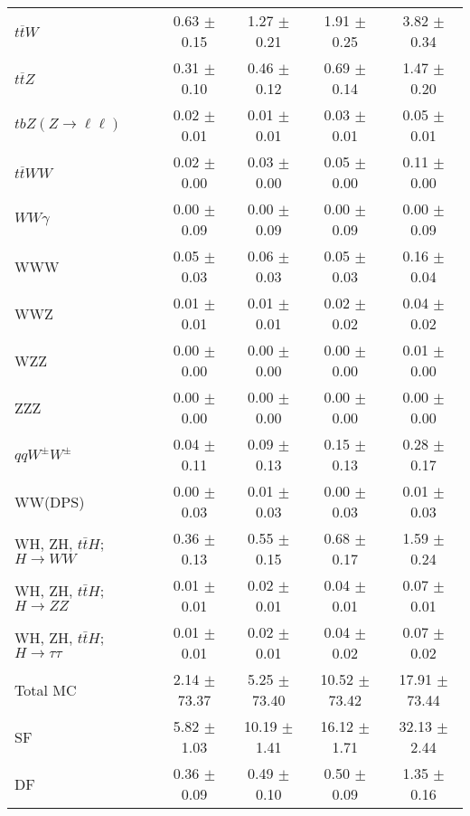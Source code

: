 \begin{tabular}{l|cccc}
                   $t\overline{t}W$ &  0.63 $\pm$  0.15 &  1.27 $\pm$  0.21 &  1.91 $\pm$  0.25 &  3.82 $\pm$  0.34 \\
                   $t\overline{t}Z$ &  0.31 $\pm$  0.10 &  0.46 $\pm$  0.12 &  0.69 $\pm$  0.14 &  1.47 $\pm$  0.20 \\
    $tbZ (Z \rightarrow \ell \ell)$ &  0.02 $\pm$  0.01 &  0.01 $\pm$  0.01 &  0.03 $\pm$  0.01 &  0.05 $\pm$  0.01 \\
                  $t\overline{t}WW$ &  0.02 $\pm$  0.00 &  0.03 $\pm$  0.00 &  0.05 $\pm$  0.00 &  0.11 $\pm$  0.00 \\
                         $WW\gamma$ &  0.00 $\pm$  0.09 &  0.00 $\pm$  0.09 &  0.00 $\pm$  0.09 &  0.00 $\pm$  0.09 \\
                                WWW &  0.05 $\pm$  0.03 &  0.06 $\pm$  0.03 &  0.05 $\pm$  0.03 &  0.16 $\pm$  0.04 \\
                                WWZ &  0.01 $\pm$  0.01 &  0.01 $\pm$  0.01 &  0.02 $\pm$  0.02 &  0.04 $\pm$  0.02 \\
                                WZZ &  0.00 $\pm$  0.00 &  0.00 $\pm$  0.00 &  0.00 $\pm$  0.00 &  0.01 $\pm$  0.00 \\
                                ZZZ &  0.00 $\pm$  0.00 &  0.00 $\pm$  0.00 &  0.00 $\pm$  0.00 &  0.00 $\pm$  0.00 \\
                 $qqW^{\pm}W^{\pm}$ &  0.04 $\pm$  0.11 &  0.09 $\pm$  0.13 &  0.15 $\pm$  0.13 &  0.28 $\pm$  0.17 \\
                            WW(DPS) &  0.00 $\pm$  0.03 &  0.01 $\pm$  0.03 &  0.00 $\pm$  0.03 &  0.01 $\pm$  0.03 \\
WH, ZH, $t\bar{t}H$; $H \rightarrow WW$ &  0.36 $\pm$  0.13 &  0.55 $\pm$  0.15 &  0.68 $\pm$  0.17 &  1.59 $\pm$  0.24 \\
WH, ZH, $t\bar{t}H$; $H \rightarrow ZZ$ &  0.01 $\pm$  0.01 &  0.02 $\pm$  0.01 &  0.04 $\pm$  0.01 &  0.07 $\pm$  0.01 \\
WH, ZH, $t\bar{t}H$; $H \rightarrow \tau\tau$ &  0.01 $\pm$  0.01 &  0.02 $\pm$  0.01 &  0.04 $\pm$  0.02 &  0.07 $\pm$  0.02 \\
\hline\hline
                           Total MC &  2.14 $\pm$ 73.37 &  5.25 $\pm$ 73.40 & 10.52 $\pm$ 73.42 & 17.91 $\pm$ 73.44 \\
\hline
                                 SF &  5.82 $\pm$  1.03 & 10.19 $\pm$  1.41 & 16.12 $\pm$  1.71 & 32.13 $\pm$  2.44 \\
                                 DF &  0.36 $\pm$  0.09 &  0.49 $\pm$  0.10 &  0.50 $\pm$  0.09 &  1.35 $\pm$  0.16 \\

\end{tabular}
